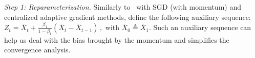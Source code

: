 \documentclass[anon,12pt]{colt2021} %
\begin{document}
\noindent \textsl{Step 1: Reparameterization.} \hspace{0.01in} Similarly to~\cite{yan2018unified, chen2018convergence} with SGD (with momentum) and centralized adaptive gradient methods, define the following auxiliary sequence:
 $
 Z_{t} = \overline X_t + \frac{\beta_1}{1-\beta_1} (\overline X_t - \overline X_{t-1}) \, ,
 $
with $\overline X_{0} \triangleq \overline X_1$.
Such an auxiliary sequence can help us deal with the bias brought by the momentum and simplifies the convergence analysis. 
 
\end{document}
